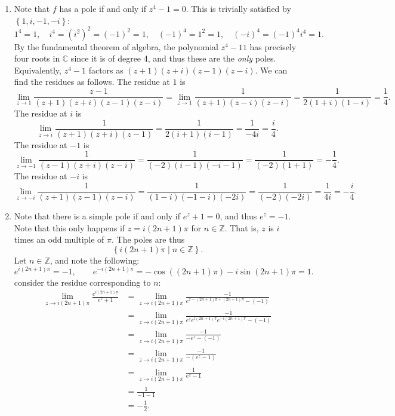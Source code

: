 \documentclass[11pt, letterpaper]{article}
\begin{document}
\begin{enumerate}
	\item Note that $f$ has a pole if and only if $z^4-1=0$. This is trivially satisfied by $\left\{ 1,i,-1,-i \right\} $:
		\[
			1^4=1,\quad i^4 = \left( i^2 \right)^2=(-1)^2=1,\quad (-1)^4=1^2=1,\quad (-i)^4=(-1)^4i^4=1
		.\]
		By the fundamental theorem of algebra, the polynomial $z^4-11$ has precisely four roots in $\mathbb{C} $ since it is of degree 4, and thus these are the \emph{only} poles. Equivalently, $z^4-1$ factors as $(z+1)(z+i)(z-1)(z-i)$. We can find the residues as follows. The residue at $1$ is
		\[
			\lim_{z \to 1} \frac{z-1}{(z+1)(z+i)(z-1)(z-i)} =\lim_{z \to 1} \frac{1}{(z+1)(z-i)(z-i)} =\frac{1}{2(1+i)(1-i)} =\frac{1}{4} 
		.\]
		The residue at $i$ is
		\[
			\lim_{z \to i} \frac{1}{(z+1)(z+i)(z-1)} =\frac{1}{2(i+1)(i-1)} =\frac{1}{-4i} =\frac{i}{4} 
		.\]
		The residue at $-1$ is
		\[
			\lim_{z \to -1} \frac{1}{(z-1)(z+i)(z-i)} =\frac{1}{(-2)(i-1)(-i-1)} =\frac{1}{(-2)(1+1)} =-\frac{1}{4} 
		.\]
		The residue at $-i$ is
		\[
			\lim_{z \to -i} \frac{1}{(z+1)(z-1)(z-i)} =\frac{1}{(1-i)(-1-i)(-2i)} =\frac{1}{(-2)(-2i)} =\frac{1}{4i} =-\frac{i}{4} 
		.\]
	\item Note that there is a simple pole if and only if $e^z+1=0$, and thus $e^z=-1$. Note that this only happens if $z=i(2n+1)\pi $ for $n\in\mathbb{Z} $. That is, $z$ is $i$ times an odd multiple of $\pi $. The poles are thus
		\[
			\left\{ i(2n+1)\pi \mid n\in\mathbb{Z}  \right\} 
		.\]
		Let $n\in\mathbb{Z} $, and note the following:
		\[
			e^{i(2n+1)\pi } =-1,\qquad e^{-i(2n+1)\pi } =-\cos((2n+1)\pi )-i \sin (2n+1)\pi =1
		.\]
		consider the residue corresponding to $n$:
		\begin{align*}
			\lim_{z \to i(2n+1)\pi } \frac{e^{i(2n+1)\pi } }{e^z+1} &=\lim_{z \to i(2n+1)\pi } \frac{-1}{e^{z-(2n+1)\pi +(2n+1)\pi } -(-1)} \\
										&=\lim_{z \to i(2n+1)\pi } \frac{-1 }{e^{z} e^{i(2n+1)\pi } e^{-i(2n+1)\pi } -(-1) } \\
										&=\lim_{z \to i(2n+1)\pi } \frac{-1}{-e^{z} -(-1)} \\
										&=\lim_{z \to i(2n+1)\pi } \frac{-1}{-\left( e^{z} -1 \right) } \\
										&=\lim_{z \to i(2n+1)\pi } \frac{1}{e^{z} -1} \\
										&=\frac{1}{-1-1} \\
										&=-\frac{1}{2} 
		.\end{align*}
\end{enumerate}
\end{document}
